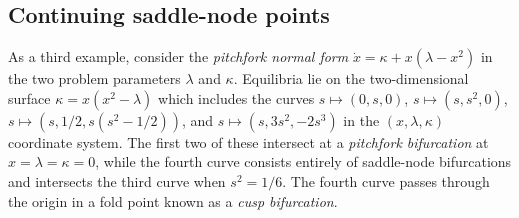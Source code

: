 \subsection{Continuing saddle-node points}
\label{sec: Continuing saddle-node points}
As a third example, consider the \textit{pitchfork normal form} $\dot{x}=\kappa+x(\lambda-x^2)$ in the two problem parameters $\lambda$ and $\kappa$. Equilibria lie on the two-dimensional surface $\kappa=x(x^2-\lambda)$ which includes the curves $s\mapsto (0,s,0)$, $s\mapsto (s,s^2,0)$, $s\mapsto (s,1/2,s(s^2-1/2))$, and $s\mapsto (s,3s^2,-2s^3)$ in the $(x,\lambda,\kappa)$ coordinate system. The first two of these intersect at a \textit{pitchfork bifurcation} at $x=\lambda=\kappa=0$, while the fourth curve consists entirely of saddle-node bifurcations and intersects the third curve when $s^2=1/6$. The fourth curve passes through the origin in a fold point known as a \textit{cusp bifurcation}.

